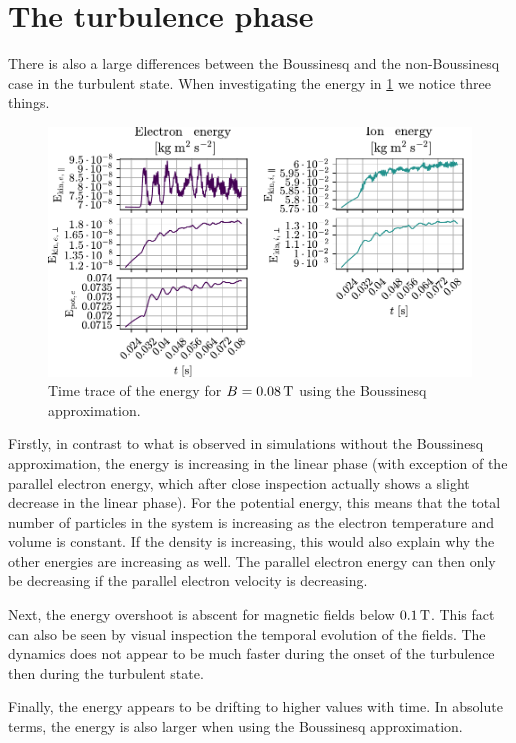 \section{The turbulence phase}
%
There is also a large differences between the Boussinesq and the non-Boussinesq case in the turbulent state.
When investigating the energy in \cref{fig:energies008B} we notice three things.
%
\begin{figure}[htb]
    \centering
    \includegraphics{fig/results/compareBouss/energies008B}
    \caption{Time trace of the energy for $B=0.08\, \text{T}$ using the Boussinesq approximation.}
    \label{fig:energies008B}
\end{figure}
%
Firstly, in contrast to what is observed in simulations without the Boussinesq approximation, the energy is increasing in the linear phase (with exception of the parallel electron energy, which after close inspection actually shows a slight decrease in the linear phase).
For the potential energy, this means that the total number of particles in the system is increasing as the electron temperature and volume is constant.
If the density is increasing, this would also explain why the other energies are increasing as well.
The parallel electron energy can then only be decreasing if the parallel electron velocity is decreasing.

Next, the energy overshoot is abscent for magnetic fields below $0.1\, \text{T}$.
This fact can also be seen by visual inspection the temporal evolution of the fields.
The dynamics does not appear to be much faster during the onset of the turbulence then during the turbulent state.

Finally, the energy appears to be drifting to higher values with time.
In absolute terms, the energy is also larger when using the Boussinesq approximation.

